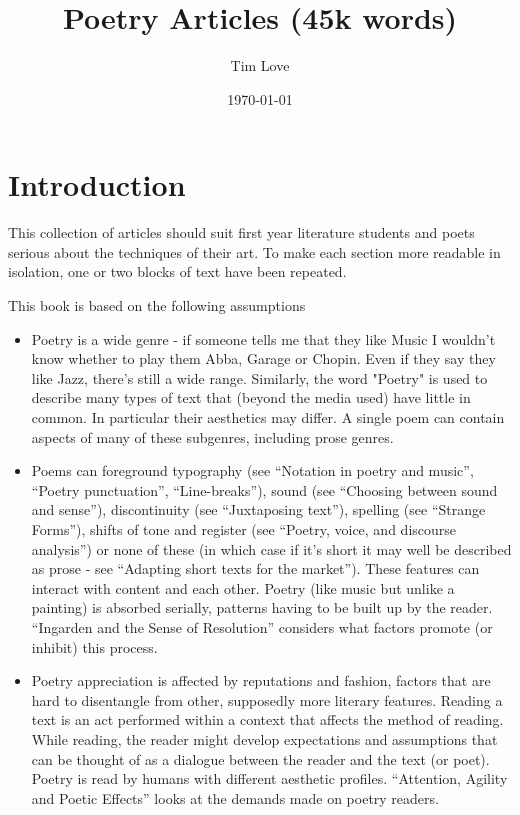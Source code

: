 \documentclass[11pt]{article}
\begin{document}
\title{Poetry Articles (45k words)}
\author{Tim Love}
\date{\today}
\maketitle
\tableofcontents

\newpage
\section{Introduction}
This collection of articles should suit first year literature students and poets serious about the techniques of their art. To make each section more readable in isolation, one or two blocks of text have been repeated.

This book is based on the following assumptions
\begin{itemize}

\item    Poetry is a wide genre - if someone tells me that they like Music I wouldn't know whether to play them Abba, Garage or Chopin. Even if they say they like Jazz, there's still a wide range. Similarly, the word "Poetry" is used to describe many types of text that (beyond the media used) have little in common. In particular their aesthetics may differ. A single poem can contain aspects of many of these subgenres, including prose genres.
\item Poems can foreground typography (see ``Notation in poetry and music'', ``Poetry punctuation'', ``Line-breaks''), sound (see ``Choosing between sound and sense''), discontinuity (see ``Juxtaposing text''), spelling (see ``Strange Forms''), shifts of tone and register (see ``Poetry, voice, and discourse analysis'') or none of these (in which case if it's short it may well be described as prose - see ``Adapting short texts for the market''). These features can interact with content and each other. Poetry (like music but unlike a painting) is absorbed serially, patterns having to be built up by the reader. ``Ingarden and the Sense of Resolution'' considers what factors promote (or inhibit) this process.

\item Poetry appreciation is affected by reputations and fashion, factors that are hard to disentangle from other, supposedly more literary features. Reading a text is an act performed within a context that affects the method of reading. While reading, the reader might develop expectations and assumptions that can be thought of as a dialogue between the reader and the text (or poet).  Poetry is read by humans with different aesthetic profiles. ``Attention, Agility and Poetic Effects'' looks at the demands made on poetry readers.

\end{itemize}
\end{document}
